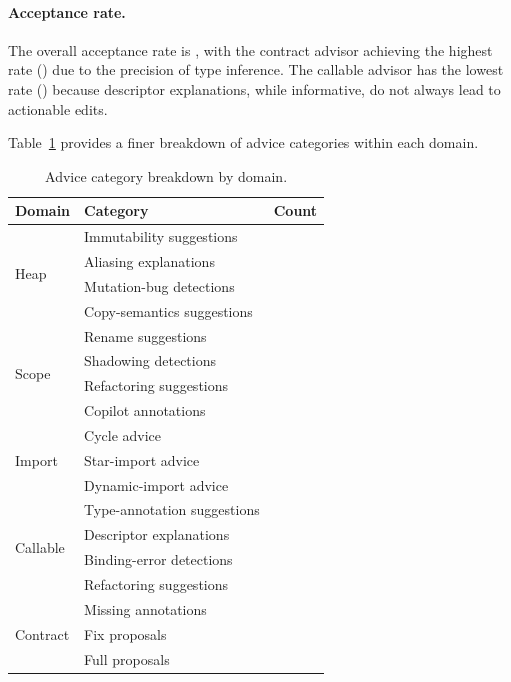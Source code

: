 \documentclass[11pt]{article}
\begin{document}
\paragraph{Acceptance rate.}
The overall acceptance rate is \ppXCtotalAcceptRate{}, with the
contract advisor achieving the highest rate (\ppXCcontractAcceptRate{})
due to the precision of type inference.  The callable advisor has the
lowest rate (\ppXCcallableAcceptRate{}) because descriptor explanations,
while informative, do not always lead to actionable edits.

Table~\ref{tab:advice-breakdown} provides a finer breakdown of advice
categories within each domain.

\begin{table}[ht]
\centering
\caption{Advice category breakdown by domain.}
\label{tab:advice-breakdown}
\begin{tabular}{@{}llr@{}}
\toprule
\textbf{Domain} & \textbf{Category} & \textbf{Count} \\
\midrule
\multirow{4}{*}{Heap}
  & Immutability suggestions   & \ppXCheapImmutSuggestions{} \\
  & Aliasing explanations      & \ppXCheapAliasingExplained{} \\
  & Mutation-bug detections    & \ppXCheapMutationBugs{} \\
  & Copy-semantics suggestions & \ppXCheapCopySuggestions{} \\
\midrule
\multirow{4}{*}{Scope}
  & Rename suggestions         & \ppXCscopeRenameSuggestions{} \\
  & Shadowing detections       & \ppXCscopeShadowDetections{} \\
  & Refactoring suggestions    & \ppXCscopeRefactorSuggestions{} \\
  & Copilot annotations        & \ppXCscopeAnnotations{} \\
\midrule
\multirow{3}{*}{Import}
  & Cycle advice               & \ppXCimportCycleAdvice{} \\
  & Star-import advice         & \ppXCimportStarAdvice{} \\
  & Dynamic-import advice      & \ppXCimportDynamicAdvice{} \\
\midrule
\multirow{4}{*}{Callable}
  & Type-annotation suggestions  & \ppXCcallableTypeSuggestions{} \\
  & Descriptor explanations      & \ppXCcallableDescriptorExplained{} \\
  & Binding-error detections     & \ppXCcallableBindingErrors{} \\
  & Refactoring suggestions      & \ppXCcallableRefactorSuggestions{} \\
\midrule
\multirow{3}{*}{Contract}
  & Missing annotations        & \ppXCcontractMissingAnnotations{} \\
  & Fix proposals              & \ppXCcontractFixAnnotations{} \\
  & Full proposals             & \ppXCcontractProposals{} \\
\bottomrule
\end{tabular}
\end{table}
\end{document}
